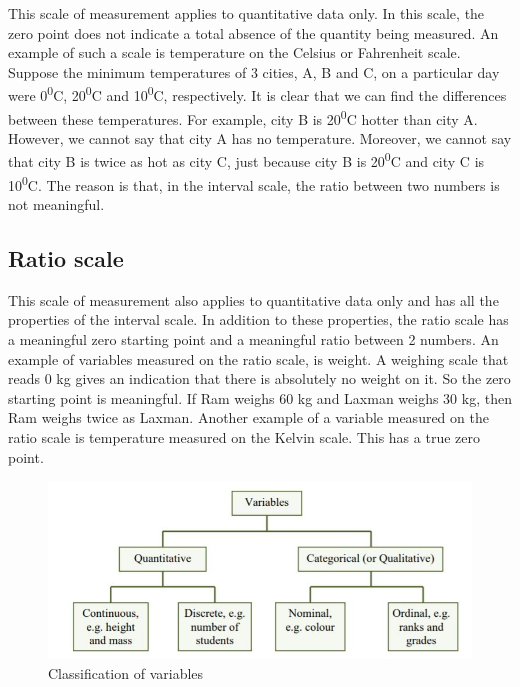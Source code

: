 \documentclass[
]{book}
\begin{document}
This scale of measurement applies to quantitative data only. In this
scale, the zero point does not indicate a total absence of the quantity
being measured. An example of such a scale is temperature on the Celsius
or Fahrenheit scale. Suppose the minimum temperatures of 3 cities, A, B
and C, on a particular day were 0\textsuperscript{0}C, 20\textsuperscript{0}C and 10\textsuperscript{0}C, respectively.
It is clear that we can find the differences between these temperatures.
For example, city B is 20\textsuperscript{0}C hotter than city A. However, we cannot say
that city A has no temperature. Moreover, we cannot say that city B is
twice as hot as city C, just because city B is 20\textsuperscript{0}C and city C is
10\textsuperscript{0}C. The reason is that, in the interval scale, the ratio between two
numbers is not meaningful.

\subsection{Ratio scale}\label{ratio-scale}

This scale of measurement also applies to quantitative data only and has
all the properties of the interval scale. In addition to these
properties, the ratio scale has a meaningful zero starting point and a
meaningful ratio between 2 numbers. An example of variables measured on
the ratio scale, is weight. A weighing scale that reads 0 kg gives an
indication that there is absolutely no weight on it. So the zero
starting point is meaningful. If Ram weighs 60 kg and Laxman weighs 30
kg, then Ram weighs twice as Laxman. Another example of a variable
measured on the ratio scale is temperature measured on the Kelvin scale.
This has a true zero point.

\begin{figure}

{\centering \includegraphics[width=1\linewidth]{images/image2} 

}

\caption{Classification of variables}\label{fig:variables}
\end{figure}
\end{document}
